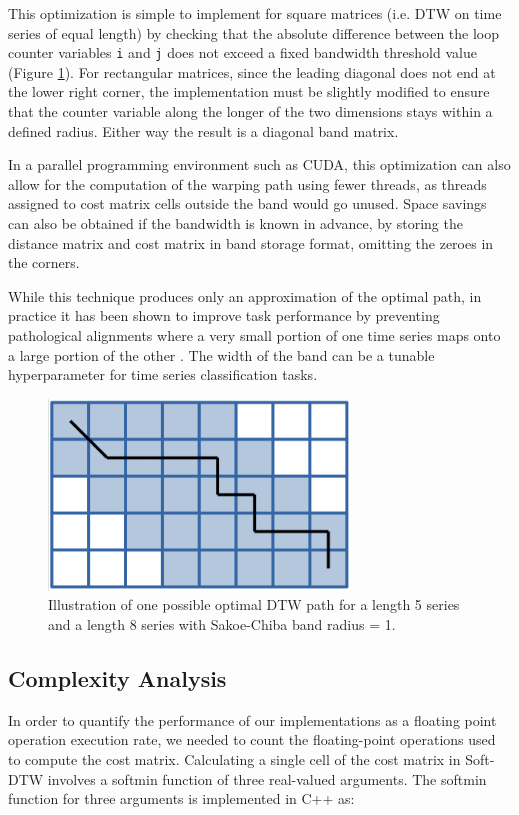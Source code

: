 \documentclass[12pt, letterpaper]{article}
\begin{document}
This optimization is simple to implement for square matrices (i.e. DTW on time
series of equal length) by checking that the absolute difference between the
loop counter variables \verb|i| and \verb|j| does not exceed a fixed bandwidth
threshold value (Figure \ref{sakoe_chiba}). For rectangular matrices, since the
leading diagonal does not end at the lower right corner, the implementation must
be slightly modified to ensure that the counter variable along the longer of the
two dimensions stays within a defined radius. Either way the result is a
diagonal band matrix.

In a parallel programming environment such as CUDA, this optimization can also
allow for the computation of the warping path using fewer threads, as threads
assigned to cost matrix cells outside the band would go unused. Space savings
can also be obtained if the bandwidth is known in advance, by storing the
distance matrix and cost matrix in band storage format, omitting the zeroes
in the corners.

While this technique produces only an approximation of the optimal path, in
practice it has been shown to improve task performance by preventing
pathological alignments where a very small portion of one time series maps onto
a large portion of the other \cite{keogh_exact_2002}. The width of the band
can be a tunable hyperparameter for time series classification tasks.

\begin{figure}[htbp]
\includegraphics[height=2in]{img/sakoe_chiba.png}
\centering
\caption{Illustration of one possible optimal DTW path for a length 5 series and
a length 8 series with Sakoe-Chiba band radius = 1.}
\label{sakoe_chiba}
\end{figure}

\subsection{Complexity Analysis}

In order to quantify the performance of our implementations as a floating point
operation execution rate, we needed to count the floating-point operations used
to compute the cost matrix. Calculating a single cell of the cost matrix in
Soft-DTW involves a softmin function of three real-valued arguments. The softmin
function for three arguments is implemented in C++ as:
\end{document}
